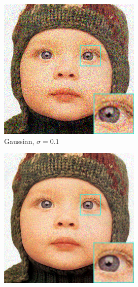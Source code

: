 \begin{figure}
	\centering
	\begin{subfigure}{0.24\textwidth}
		\includegraphics[width=\textwidth]{images/exp0.1/gaussian0.png}
		\caption{Gaussian, $\sigma=0.1$}
	\end{subfigure}
	\begin{subfigure}{0.24\textwidth}
		\includegraphics[width=\textwidth]{images/exp0.1/poisson0.png}

\end{subfigure}
\end{figure}

